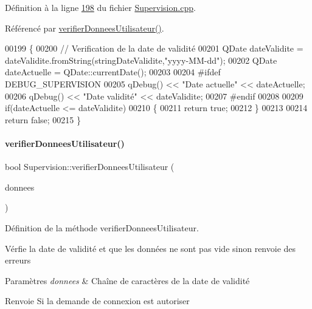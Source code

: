 Définition à la ligne \hyperlink{_supervision_8cpp_source_l00198}{198} du fichier \hyperlink{_supervision_8cpp_source}{Supervision.\+cpp}.



Référencé par \hyperlink{_supervision_8cpp_source_l00224}{verifier\+Donnees\+Utilisateur()}.


\begin{DoxyCode}
00199 \{
00200     \textcolor{comment}{// Verification de la date de validité}
00201     QDate dateValidite = dateValidite.fromString(stringDateValidite,\textcolor{stringliteral}{"yyyy-MM-dd"});
00202     QDate dateActuelle = QDate::currentDate();
00203 
00204 \textcolor{preprocessor}{    #ifdef DEBUG\_SUPERVISION}
00205         qDebug() << \textcolor{stringliteral}{"Date actuelle"} << dateActuelle;
00206         qDebug() << \textcolor{stringliteral}{"Date validité"} << dateValidite;
00207 \textcolor{preprocessor}{    #endif}
00208 
00209     \textcolor{keywordflow}{if}(dateActuelle <= dateValidite)
00210     \{
00211         \textcolor{keywordflow}{return} \textcolor{keyword}{true};
00212     \}
00213 
00214     \textcolor{keywordflow}{return} \textcolor{keyword}{false};
00215 \}
\end{DoxyCode}
\mbox{\label{class_supervision_ae3400dad53c52bc09198e8d7f80e0e67}} 
\paragraph{\texorpdfstring{verifier\+Donnees\+Utilisateur()}{verifierDonneesUtilisateur()}}
{\footnotesize\ttfamily bool Supervision\+::verifier\+Donnees\+Utilisateur (\begin{DoxyParamCaption}\item[{Q\+String\+List \&}]{donnees }\end{DoxyParamCaption})\hspace{0.3cm}{\ttfamily [private]}}



Définition de la méthode verifier\+Donnees\+Utilisateur. 

Vérfie la date de validité et que les données ne sont pas vide sinon renvoie des erreurs 
\begin{DoxyParams}{Paramètres}
{\em donnees} & Chaîne de caractères de la date de validité \\
\hline
\end{DoxyParams}
\begin{DoxyReturn}{Renvoie}
Si la demande de connexion est autoriser 
\end{DoxyReturn}


